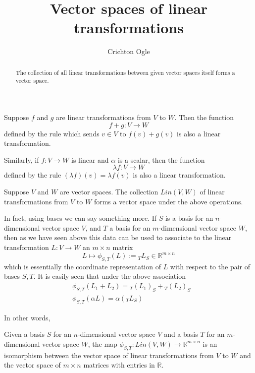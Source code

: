 \documentclass{ximera}
\title{Vector spaces of linear transformations}
\author{Crichton Ogle}
\begin{document}
\begin{abstract}
  The collection of all linear transformations between given vector
  spaces itself forms a vector space.
\end{abstract}
\maketitle

Suppose $f$ and $g$ are linear transformations from $V$ to $W$.  Then the function
\[
  f + g : V \to W
\]
defined by the rule which sends $v \in V$ to $f(v) + g(v)$ is also a
linear transformation.

Similarly, if $f : V \to W$ is linear and $\alpha$ is a scalar, then
the function
\[
  \lambda f : V \to W
\]
defined by the rule $(\lambda f)(v) = \lambda f(v)$ is also a linear
transformation.

\begin{theorem} Suppose $V$ and $W$ are vector spaces.  The collection
  $Lin(V,W)$ of linear transformations from $V$ to $W$ forms a vector space under the above operations.
\end{theorem}

In fact, using bases we can say something more. If $S$ is a basis for an $n$-dimensional vector space $V$, and $T$ a basis for an $m$-dimensional vector space $W$, then as we have seen above this data can be used to associate to the linear transformation $L:V\to W$ an $m\times n$ matrix
\[
L\mapsto \phi_{S,T}(L) := {}_T L_S\in \mathbb R^{m\times n}
\]
which is essentially the coordinate representation of $L$ with respect to the pair of bases $S,T$. It is easily seen that under the above association
\begin{align*}
&\phi_{S,T}(L_1 + L_2) = {}_T (L_1)_S + {}_T (L_2)_S\\
& \phi_{S,T}(\alpha L) = \alpha ({}_T L_S)
\end{align*}

In other words,

\begin{theorem}
Given a basis $S$ for an $n$-dimensional vector space $V$ and a basis $T$ for an $m$-dimensional vector space $W$, the map $\phi_{S,T}: Lin(V,W)\to \mathbb R^{m\times n}$ is an isomorphism between the vector space of linear transformations from $V$ to $W$ and the vector space of $m\times n$ matrices with entries in $\mathbb R$.
\end{theorem}


\end{document}
